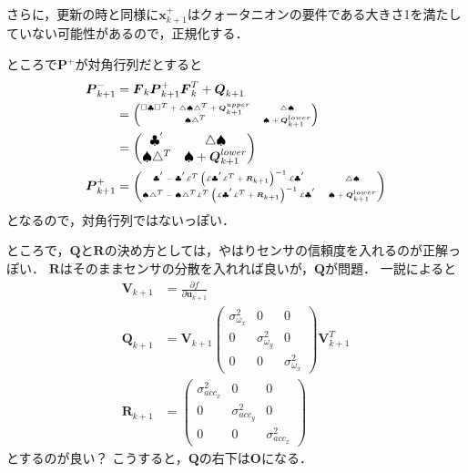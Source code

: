 さらに，更新の時と同様に$\boldsymbol{x}_{k+1}^{+}$はクォータニオンの要件である大きさ1を満たしていない可能性があるので，正規化する．

ところで$\boldsymbol{P}^{+}$が対角行列だとすると
\begin{align}
\boldsymbol{P}_{k+1}^{-} &= \boldsymbol{F}_{k} \boldsymbol{P}_{k+1}^{+} \boldsymbol{F}_{k}^{T} +
  \boldsymbol{Q}_{k+1}\\
  &=
  {\tiny
    \begin{pmatrix}
      \Box \clubsuit \Box^{T} + \triangle \spadesuit \triangle^{T} + \boldsymbol{Q}_{k+1}^{upper} & \triangle \spadesuit\\
      \spadesuit \triangle^{T} & \spadesuit + \boldsymbol{Q}_{k+1}^{lower}
    \end{pmatrix}
  }\\
  &=
  \begin{pmatrix}
    \clubsuit^{'} & \triangle \spadesuit\\
    \spadesuit \triangle^{T} & \spadesuit + \boldsymbol{Q}_{k+1}^{lower}
  \end{pmatrix}\\
  \boldsymbol{P}_{k+1}^{+} &=
  {\tiny
    \begin{pmatrix}
      \clubsuit^{'} - \clubsuit^{'} \pounds^{T} \left(\pounds \clubsuit^{'} \pounds^{T} + \boldsymbol{R}_{k+1}\right)^{-1} \pounds \clubsuit^{'} & \triangle \spadesuit\\
      \spadesuit \triangle^{T} - \spadesuit \triangle^{T} \pounds^{T} \left(\pounds \clubsuit^{'} \pounds^{T} + \boldsymbol{R}_{k+1}\right)^{-1} \pounds \clubsuit^{'} & \spadesuit + \boldsymbol{Q}_{k+1}^{lower}
    \end{pmatrix}
  }
\end{align}
となるので，対角行列ではないっぽい．

ところで，$\boldsymbol{Q}$と$\boldsymbol{R}$の決め方としては，やはりセンサの信頼度を入れるのが正解っぽい．
$\boldsymbol{R}$はそのままセンサの分散を入れれば良いが，$\boldsymbol{Q}$が問題．
一説によると
\begin{align}
  \boldsymbol{V}_{k+1} &= \frac{\partial f}{\partial \boldsymbol{u}_{k+1}}\\
  \boldsymbol{Q}_{k+1} &=
  \boldsymbol{V}_{k+1}
  \begin{pmatrix}
    \sigma_{\omega_x}^2 & 0 & 0\\
    0 & \sigma_{\omega_y}^2 & 0\\
    0 & 0 & \sigma_{\omega_x}^2
  \end{pmatrix}
  \boldsymbol{V}_{k+1}^{T}\\
  \boldsymbol{R}_{k+1} &=
  \begin{pmatrix}
    \sigma_{acc_x}^2 & 0 & 0\\
    0 & \sigma_{acc_y}^2 & 0\\
    0 & 0 & \sigma_{acc_x}^2
  \end{pmatrix}
\end{align}
とするのが良い？
こうすると，$\boldsymbol{Q}$の右下は$\boldsymbol{O}$になる．

